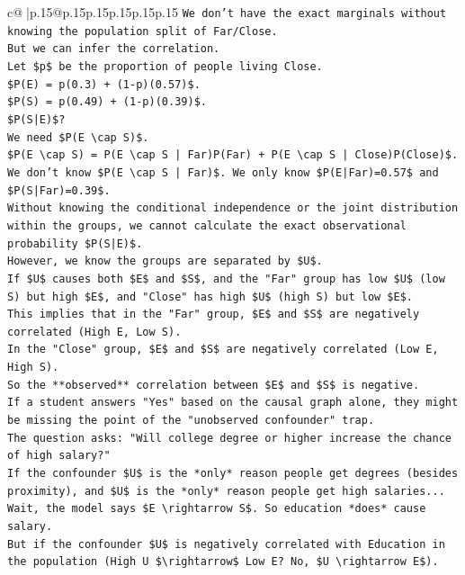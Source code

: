 \documentclass{article}
\begin{document}
{\begin{supertabular}{c@{$\;$}|p{.15\linewidth}@{}p{.15\linewidth}p{.15\linewidth}p{.15\linewidth}p{.15\linewidth}p{.15\linewidth}}
{{{\texttt{We don't have the exact marginals without knowing the population split of Far/Close.} \\
\texttt{But we can infer the correlation.} \\
\texttt{Let \$p\$ be the proportion of people living Close.} \\
\texttt{\$P(E) = p(0.3) + (1{-}p)(0.57)\$.} \\
\texttt{\$P(S) = p(0.49) + (1{-}p)(0.39)\$.} \\
\texttt{\$P(S|E)\$?} \\
\texttt{We need \$P(E \textbackslash{}cap S)\$.} \\
\texttt{\$P(E \textbackslash{}cap S) = P(E \textbackslash{}cap S | Far)P(Far) + P(E \textbackslash{}cap S | Close)P(Close)\$.} \\
\texttt{We don't know \$P(E \textbackslash{}cap S | Far)\$. We only know \$P(E|Far)=0.57\$ and \$P(S|Far)=0.39\$.} \\
\texttt{Without knowing the conditional independence or the joint distribution within the groups, we cannot calculate the exact observational probability \$P(S|E)\$.} \\
\texttt{However, we know the groups are separated by \$U\$.} \\
\texttt{If \$U\$ causes both \$E\$ and \$S\$, and the "Far" group has low \$U\$ (low S) but high \$E\$, and "Close" has high \$U\$ (high S) but low \$E\$.} \\
\texttt{This implies that in the "Far" group, \$E\$ and \$S\$ are negatively correlated (High E, Low S).} \\
\texttt{In the "Close" group, \$E\$ and \$S\$ are negatively correlated (Low E, High S).} \\
\texttt{So the **observed** correlation between \$E\$ and \$S\$ is negative.} \\
\texttt{If a student answers "Yes" based on the causal graph alone, they might be missing the point of the "unobserved confounder" trap.} \\
\texttt{The question asks: "Will college degree or higher increase the chance of high salary?"} \\
\texttt{If the confounder \$U\$ is the *only* reason people get degrees (besides proximity), and \$U\$ is the *only* reason people get high salaries...} \\
\texttt{Wait, the model says \$E \textbackslash{}rightarrow S\$. So education *does* cause salary.} \\
\texttt{But if the confounder \$U\$ is negatively correlated with Education in the population (High U \$\textbackslash{}rightarrow\$ Low E? No, \$U \textbackslash{}rightarrow E\$).} \\
}}}
\end{supertabular}}
\end{document}
